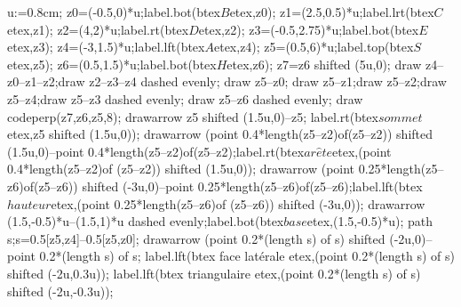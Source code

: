 \begin{minipage}{0.35\linewidth}
    \begin{Geometrie}[CoinBG={(-4.5u,-u)}]
        u:=0.8cm;
        z0=(-0.5,0)*u;label.bot(btex$B$etex,z0);
        z1=(2.5,0.5)*u;label.lrt(btex$C$etex,z1);
        z2=(4,2)*u;label.rt(btex$D$etex,z2);
        z3=(-0.5,2.75)*u;label.bot(btex$E$etex,z3);
        z4=(-3,1.5)*u;label.lft(btex$A$etex,z4);
        z5=(0.5,6)*u;label.top(btex$S$etex,z5);
        z6=(0.5,1.5)*u;label.bot(btex$H$etex,z6);
        z7=z6 shifted (5u,0);
        draw z4--z0--z1--z2;draw z2--z3--z4 dashed evenly;
        draw z5--z0; draw z5--z1;draw z5--z2;draw z5--z4;draw z5--z3 dashed evenly;
        draw z5--z6 dashed evenly; draw codeperp(z7,z6,z5,8);
        drawarrow z5 shifted (1.5u,0)--z5; label.rt(btex$sommet$etex,z5 shifted (1.5u,0));
        drawarrow (point 0.4*length(z5--z2)of(z5--z2)) shifted (1.5u,0)--point 0.4*length(z5--z2)of(z5--z2);label.rt(btex$ar\hat{e}te$etex,(point 0.4*length(z5--z2)of (z5--z2)) shifted (1.5u,0));
        drawarrow (point 0.25*length(z5--z6)of(z5--z6)) shifted (-3u,0)--point 0.25*length(z5--z6)of(z5--z6);label.lft(btex$hauteur$etex,(point 0.25*length(z5--z6)of (z5--z6)) shifted (-3u,0));
        drawarrow (1.5,-0.5)*u--(1.5,1)*u dashed evenly;label.bot(btex$base$etex,(1.5,-0.5)*u);
        path s;s=0.5[z5,z4]--0.5[z5,z0];
        drawarrow (point 0.2*(length s) of s) shifted (-2u,0)--point 0.2*(length s) of s;
        label.lft(btex face latérale etex,(point 0.2*(length s) of s) shifted (-2u,0.3u));
        label.lft(btex triangulaire etex,(point 0.2*(length s) of s) shifted (-2u,-0.3u));
    \end{Geometrie}
\end{minipage}
